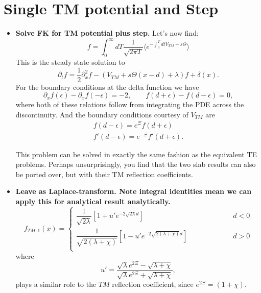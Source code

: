 \section{Single TM potential and Step}

\begin{itemize}
  \item \textbf{Solve FK for TM potential plus step. }
Let's now find: 
\begin{equation}
f = \int_0^\infty dT \frac{1}{\sqrt{2\pi T}}\langle e^{-\int_0^T dt V_{TM} + s\Theta}\rangle 
\end{equation}
This is the steady state solution to 
\begin{equation}
\partial_t f = \frac{1}{2}\partial_x^2f -(V_{TM} + s\Theta(x-d)+\lambda)f +\delta(x). 
\end{equation}
For the boundary conditions at the delta function we have 
\begin{equation}
\partial_xf(\epsilon) -\partial_x f(-\epsilon) = -2 , \qquad f(d+\epsilon)-f(d-\epsilon) = 0,
\end{equation}
where both of these relations follow from integrating the PDE across the discontinuity.
 And the boundary conditions courtesy of $V_{TM}$ are
\begin{align}
f(d-\epsilon) = e^{\Xi}f(d+\epsilon)\\
f'(d-\epsilon) = e^{-\Xi}f'(d+\epsilon).
\end{align}

This problem can be solved in exactly the same fashion as the equivalent TE problems.
 Perhaps unsurprisingly, you find that the two slab results can also be ported over, but with their TM reflection coefficients.  

  \item \textbf{Leave as Laplace-transform.  Note integral identities mean we can apply this for analytical
    result analytically.  }
\begin{equation}
f_{TM,1}(x) = \left\{\begin{array}{lcr} 
\dfrac{1}{\sqrt{2\lambda}}\left[1+ u' e^{-2\sqrt{2\lambda}d}\right]  & \hspace{2cm} & d<0\\
\dfrac{1}{\sqrt{2(\lambda+\chi)}}\left[1 - u' e^{-2\sqrt{2(\lambda+\chi)}d}\right] & \hspace{2cm} & d>0\\
\end{array} \right. 
\end{equation}
where
\begin{equation}
u' = \frac{\sqrt{\lambda}e^{2\Xi} -\sqrt{\lambda+\chi}}{\sqrt{\lambda}e^{2\Xi} + \sqrt{\lambda+\chi}},
\end{equation}
plays a similar role to the $TM$ reflection coefficient, since $e^{2\Xi} = (1+\chi)$.   


\end{itemize}
